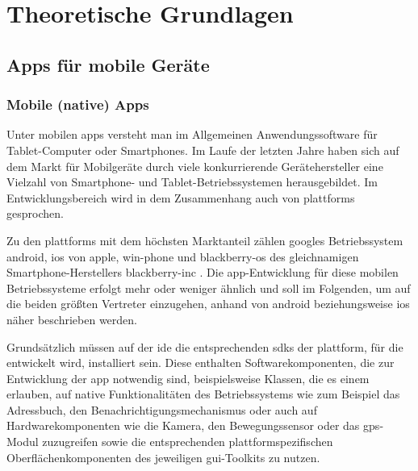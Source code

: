 \part{Theoretische Grundlagen}

\chapter{Apps für mobile Geräte}

\section{Mobile (native) Apps} \label{sec:native}
Unter mobilen \glspl{app} versteht man im Allgemeinen Anwendungssoftware für Tablet-Computer oder Smartphones. 
Im Laufe der letzten Jahre haben sich auf dem Markt für Mobilgeräte durch viele konkurrierende Gerätehersteller eine Vielzahl von Smartphone- und Tablet-Betriebssystemen herausgebildet.
Im Entwicklungsbereich wird in dem Zusammenhang auch von \glspl{plattform} gesprochen.

Zu den \glspl{plattform} mit dem höchsten Marktanteil zählen \glspl{google} Betriebssystem \gls{android}, \gls{ios} von \gls{apple}, \gls{win-phone} und \gls{blackberry-os} des gleichnamigen Smartphone-Herstellers \gls{blackberry-inc} \cite{platforms-marketshare}.
Die \gls{app}-Entwicklung für diese mobilen Betriebssysteme erfolgt mehr oder weniger ähnlich und soll im Folgenden, um auf die beiden größten Vertreter einzugehen, anhand von \gls{android} beziehungsweise \gls{ios} näher beschrieben werden.

Grundsätzlich müssen auf der \gls{ide} die entsprechenden \glspl{sdk} der \gls{plattform}, für die entwickelt wird, installiert sein. 
Diese enthalten Softwarekomponenten, die zur Entwicklung der \gls{app} notwendig sind, beispielsweise Klassen, die es einem erlauben, auf native Funktionalitäten des Betriebssystems wie zum Beispiel das Adressbuch, den Benachrichtigungsmechanismus oder auch auf Hardwarekomponenten wie die Kamera, den Bewegungssensor oder das \gls{gps}-Modul zuzugreifen sowie die entsprechenden plattformspezifischen Oberflächenkomponenten des jeweiligen \gls{gui}-Toolkits zu nutzen.

